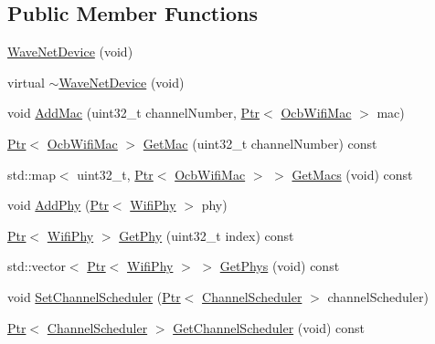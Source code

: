 \subsection*{Public Member Functions}
\begin{DoxyCompactItemize}
\item 
\hyperlink{classns3_1_1WaveNetDevice_afd2c31b5c9c07a08ca8252d32ea506d7}{Wave\+Net\+Device} (void)
\item 
virtual \hyperlink{classns3_1_1WaveNetDevice_a3d882ba56a20256a43908b20137c7811}{$\sim$\+Wave\+Net\+Device} (void)
\item 
void \hyperlink{classns3_1_1WaveNetDevice_a1c2c9c7feb2a647396934f2b538afd1b}{Add\+Mac} (uint32\+\_\+t channel\+Number, \hyperlink{classns3_1_1Ptr}{Ptr}$<$ \hyperlink{classns3_1_1OcbWifiMac}{Ocb\+Wifi\+Mac} $>$ mac)
\item 
\hyperlink{classns3_1_1Ptr}{Ptr}$<$ \hyperlink{classns3_1_1OcbWifiMac}{Ocb\+Wifi\+Mac} $>$ \hyperlink{classns3_1_1WaveNetDevice_a899f670dd8eb023f0e40f19b536724eb}{Get\+Mac} (uint32\+\_\+t channel\+Number) const 
\item 
std\+::map$<$ uint32\+\_\+t, \hyperlink{classns3_1_1Ptr}{Ptr}$<$ \hyperlink{classns3_1_1OcbWifiMac}{Ocb\+Wifi\+Mac} $>$ $>$ \hyperlink{classns3_1_1WaveNetDevice_a48869fef4b065ccb39d2210a22bbe437}{Get\+Macs} (void) const 
\item 
void \hyperlink{classns3_1_1WaveNetDevice_a067a76c0ee75baca3d269038645780da}{Add\+Phy} (\hyperlink{classns3_1_1Ptr}{Ptr}$<$ \hyperlink{classns3_1_1WifiPhy}{Wifi\+Phy} $>$ phy)
\item 
\hyperlink{classns3_1_1Ptr}{Ptr}$<$ \hyperlink{classns3_1_1WifiPhy}{Wifi\+Phy} $>$ \hyperlink{classns3_1_1WaveNetDevice_a28447ac2a7aae3a41f075d6a5741be0c}{Get\+Phy} (uint32\+\_\+t index) const 
\item 
std\+::vector$<$ \hyperlink{classns3_1_1Ptr}{Ptr}$<$ \hyperlink{classns3_1_1WifiPhy}{Wifi\+Phy} $>$ $>$ \hyperlink{classns3_1_1WaveNetDevice_a8c09cc860910de37d56a759bcea6dffa}{Get\+Phys} (void) const 
\item 
void \hyperlink{classns3_1_1WaveNetDevice_a3aa4f3edcb781fca5306e817315cd31b}{Set\+Channel\+Scheduler} (\hyperlink{classns3_1_1Ptr}{Ptr}$<$ \hyperlink{classns3_1_1ChannelScheduler}{Channel\+Scheduler} $>$ channel\+Scheduler)
\item 
\hyperlink{classns3_1_1Ptr}{Ptr}$<$ \hyperlink{classns3_1_1ChannelScheduler}{Channel\+Scheduler} $>$ \hyperlink{classns3_1_1WaveNetDevice_abae0924be9be442fa0b234c82047e368}{Get\+Channel\+Scheduler} (void) const 

\end{DoxyCompactItemize}
